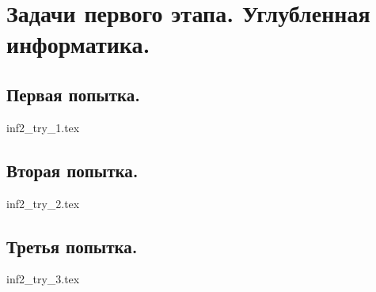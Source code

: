 \chapter{Задачи первого этапа. Углубленная информатика.}

\section{Первая попытка.}

{inf2_try_1.tex}

\section{Вторая попытка.}

{inf2_try_2.tex}

\section{Третья попытка.}

{inf2_try_3.tex}